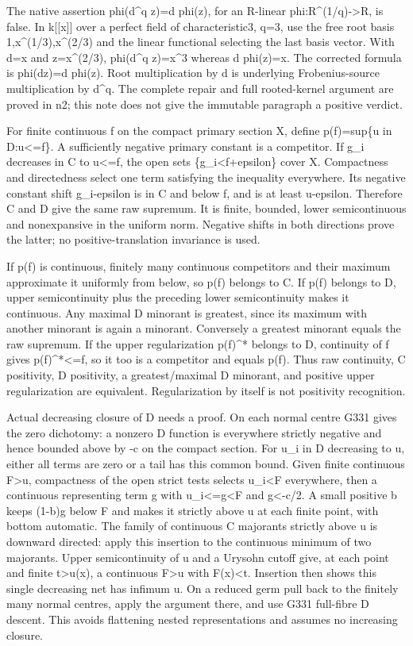 \documentclass[11pt]{article}
\begin{document}
The native assertion phi(d\textasciicircum{}q z)=d phi(z), for an R-linear phi:R\textasciicircum{}(1/q)->R, is false. In k[[x]] over a perfect field of characteristic3, q=3, use the free root basis 1,x\textasciicircum{}(1/3),x\textasciicircum{}(2/3) and the linear functional selecting the last basis vector. With d=x and z=x\textasciicircum{}(2/3), phi(d\textasciicircum{}q z)=x\textasciicircum{}3 whereas d phi(z)=x. The corrected formula is phi(dz)=d phi(z). Root multiplication by d is underlying Frobenius-source multiplication by d\textasciicircum{}q. The complete repair and full rooted-kernel argument are proved in n2; this note does not give the immutable paragraph a positive verdict.

For finite continuous f on the compact primary section X, define p(f)=sup\{u in D:u<=f\}. A sufficiently negative primary constant is a competitor. If g\_i decreases in C to u<=f, the open sets \{g\_i<f+epsilon\} cover X. Compactness and directedness select one term satisfying the inequality everywhere. Its negative constant shift g\_i-epsilon is in C and below f, and is at least u-epsilon. Therefore C and D give the same raw supremum. It is finite, bounded, lower semicontinuous and nonexpansive in the uniform norm. Negative shifts in both directions prove the latter; no positive-translation invariance is used.

If p(f) is continuous, finitely many continuous competitors and their maximum approximate it uniformly from below, so p(f) belongs to C. If p(f) belongs to D, upper semicontinuity plus the preceding lower semicontinuity makes it continuous. Any maximal D minorant is greatest, since its maximum with another minorant is again a minorant. Conversely a greatest minorant equals the raw supremum. If the upper regularization p(f)\textasciicircum{}* belongs to D, continuity of f gives p(f)\textasciicircum{}*<=f, so it too is a competitor and equals p(f). Thus raw continuity, C positivity, D positivity, a greatest/maximal D minorant, and positive upper regularization are equivalent. Regularization by itself is not positivity recognition.

Actual decreasing closure of D needs a proof. On each normal centre G331 gives the zero dichotomy: a nonzero D function is everywhere strictly negative and hence bounded above by -c on the compact section. For u\_i in D decreasing to u, either all terms are zero or a tail has this common bound. Given finite continuous F>u, compactness of the open strict tests selects u\_i<F everywhere, then a continuous representing term g with u\_i<=g<F and g<-c/2. A small positive b keeps (1-b)g below F and makes it strictly above u at each finite point, with bottom automatic. The family of continuous C majorants strictly above u is downward directed: apply this insertion to the continuous minimum of two majorants. Upper semicontinuity of u and a Urysohn cutoff give, at each point and finite t>u(x), a continuous F>u with F(x)<t. Insertion then shows this single decreasing net has infimum u. On a reduced germ pull back to the finitely many normal centres, apply the argument there, and use G331 full-fibre D descent. This avoids flattening nested representations and assumes no increasing closure.
\end{document}
